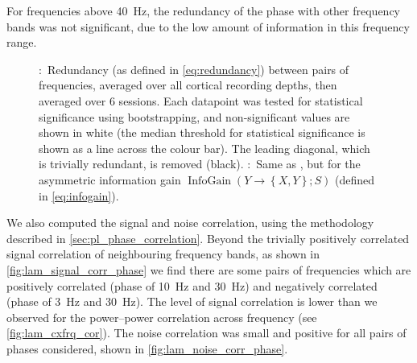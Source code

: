 For frequencies above \SI{40}{Hz}, the redundancy of the phase with other frequency bands was not significant, due to the low amount of information in this frequency range.

\begin{figure}[htbp]
\centering
\hspace*{\fill}
\hspace*{\fill}\hspace{.2cm}\hspace*{\fill}
\hspace*{\fill}
    \caption{
\protect{}:~Redundancy (as defined in \autoref{eq:redundancy}) between pairs of frequencies, averaged over all cortical recording depths, then averaged over \num{6} sessions.
Each datapoint was tested for statistical significance using bootstrapping, and non-significant values are shown in white (the median threshold for statistical significance is shown as a line across the colour bar).
The leading diagonal, which is trivially redundant, is removed (black).
\protect{}:~Same as \protect{}, but for the asymmetric information gain $\operatorname{InfoGain}\left(Y\to\left\{X,Y\right\};S\right)$ (defined in \autoref{eq:infogain}).
}
\label{fig:lam_phase_cxfrq_info}
\end{figure}


We also computed the signal and noise correlation, using the methodology described in \autoref{sec:pl_phase_correlation}.
Beyond the trivially positively correlated signal correlation of neighbouring frequency bands, as shown in \autoref{fig:lam_signal_corr_phase} we find there are some pairs of frequencies which are positively correlated (phase of \SI{10}{Hz} and \SI{30}{Hz}) and negatively correlated (phase of \SI{3}{Hz} and \SI{30}{Hz}).
The level of signal correlation is lower than we observed for the power--power correlation across frequency (see \autoref{fig:lam_cxfrq_cor}).
The noise correlation was small and positive for all pairs of phases considered, shown in \autoref{fig:lam_noise_corr_phase}.


